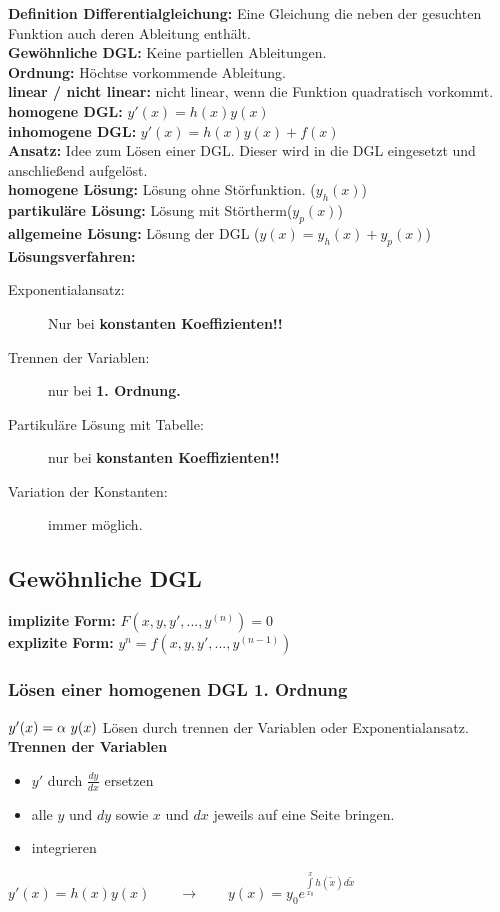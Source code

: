 \textbf{Definition Differentialgleichung:} Eine Gleichung die neben der gesuchten Funktion auch deren Ableitung enthält.\\
\textbf{Gewöhnliche DGL:} Keine partiellen Ableitungen.\\
\textbf{Ordnung:} Höchtse vorkommende Ableitung.\\
\textbf{linear / nicht linear:} nicht linear, wenn die Funktion quadratisch vorkommt.\\
\textbf{homogene DGL:} $y'(x)= h(x)y(x)$\\
\textbf{inhomogene DGL:} $y'(x)= h(x)y(x)+f(x)$\\
\textbf{Ansatz:} Idee zum Lösen einer DGL. Dieser wird in die DGL eingesetzt und anschließend aufgelöst.\\
\textbf{homogene Lösung:} Lösung ohne Störfunktion. ($y_h(x)$) \\
\textbf{partikuläre Lösung:} Lösung mit Störtherm($y_p(x)$) \\
\textbf{allgemeine Lösung:} Lösung der DGL ($y(x)=y_h(x)+y_p(x)$)\\

\textbf{Lösungsverfahren:}
\begin{description}
    \item[Exponentialansatz:] Nur bei \textbf{konstanten Koeffizienten!!}
    \item[Trennen der Variablen:] nur bei \textbf{1. Ordnung.}
    \item[Partikuläre Lösung mit Tabelle:] nur bei \textbf{konstanten Koeffizienten!!}
    \item[Variation der Konstanten:] immer möglich.  
\end{description}

\subsection{Gewöhnliche DGL}
\textbf{implizite Form:} $F(x,y,y',...,y^{(n)})=0$\\
\textbf{explizite Form:} $y^n=f(x,y,y',...,y^{(n-1)})$

\subsubsection{Lösen einer homogenen DGL 1. Ordnung}
$y'(x)=\alpha\  y(x)$
Lösen durch trennen der Variablen oder Exponentialansatz.\\

\textbf{Trennen der Variablen}
\begin{itemize}
    \item $y'$ durch $\frac{dy}{dx}$ ersetzen
    \item alle $y$ und $dy$ sowie $x$ und $dx$ jeweils auf eine Seite bringen.
    \item integrieren
\end{itemize}
$y'(x)=h(x)y(x) \qquad \rightarrow \qquad y(x) = y_0 e ^{\int\limits_{x_0}^{x}h(\tilde{x})d \tilde{x}}$\\

